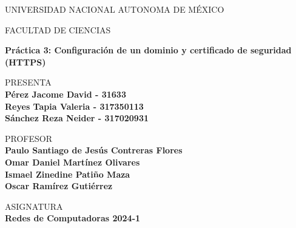 \documentclass{article}
\begin{document}
        \begin{center}
            \vspace{0.7cm}
            \LARGE
            UNIVERSIDAD NACIONAL AUTONOMA DE MÉXICO

            \vspace{0.7cm}
	        \LARGE
	        FACULTAD DE CIENCIAS

            \vspace{1.5cm}	
	        \Large
	        \textbf{Práctica 3: Configuración de un dominio y certificado de seguridad (HTTPS)}

            \vspace{1.3cm}
	        \normalsize	
	        PRESENTA \\
	        \vspace{.3cm}
	        \large
	        \textbf{Pérez Jacome David - 31633 \\
            Reyes Tapia Valeria - 317350113\\
            Sánchez Reza Neider - 317020931}


            \vspace{1.3cm}
	        \normalsize	
	        PROFESOR \\
	        \vspace{.3cm}
	        \large
	        \textbf{Paulo Santiago de Jesús Contreras Flores\\
            Omar Daniel Martínez Olivares\\
            Ismael Zinedine Patiño Maza\\
            Oscar Ramírez Gutiérrez}

            \vspace{1.3cm}
	        \normalsize	
	        ASIGNATURA \\
	        \vspace{.3cm}
	        \large
	        \textbf{Redes de Computadoras 2024-1}

            \vspace{1.3cm}
            \Today


        \end{center}
\end{document}

